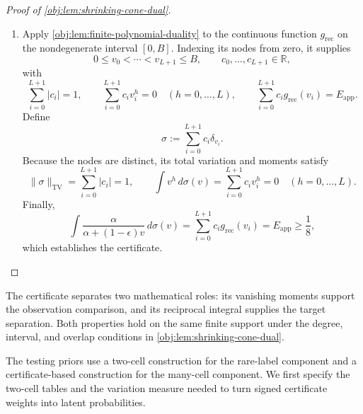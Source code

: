 \documentclass[11pt]{article}
\begin{document}
\begin{proof}[Proof of \cref{obj:lem:shrinking-cone-dual}]
\begin{enumerate}
In particular,
\[
|Q_{\mathrm{app}}'(v_{\mathrm{mvt}})|\,z_{\mathrm{rec}}
\le
\frac{9L^2}{4B}\,z_{\mathrm{rec}}
=
\frac{9}{400c_\epsilon}
\le
\frac{3}{100}
<
\frac14.
\]
This contradicts the chain
\[
\frac14
<
Q_{\mathrm{app}}(0)-Q_{\mathrm{app}}(z_{\mathrm{rec}})
\le
|Q_{\mathrm{app}}(z_{\mathrm{rec}})-Q_{\mathrm{app}}(0)|
=
|Q_{\mathrm{app}}'(v_{\mathrm{mvt}})|\,z_{\mathrm{rec}}.
\]
Therefore
\[
\|g_{\mathrm{rec}}-Q_{\mathrm{app}}\|_{\infty,[0,B]}
\ge\frac18,
\qquad
E_{\mathrm{app}}\ge\frac18.
\]

\item Apply \cref{obj:lem:finite-polynomial-duality} to the continuous function \(g_{\mathrm{rec}}\) on the nondegenerate interval \([0,B]\). Indexing its nodes from zero, it supplies
\[
0\le v_0<\cdots<v_{L+1}\le B,
\qquad
c_0,\ldots,c_{L+1}\in\mathbb R,
\]
with
\[
\sum_{i=0}^{L+1}|c_i|=1,
\qquad
\sum_{i=0}^{L+1}c_i v_i^h=0
\quad (h=0,\ldots,L),
\qquad
\sum_{i=0}^{L+1}c_i g_{\mathrm{rec}}(v_i)=E_{\mathrm{app}}.
\]
Define
\[
\sigma:=\sum_{i=0}^{L+1}c_i\delta_{v_i}.
\]
Because the nodes are distinct, its total variation and moments satisfy
\[
\|\sigma\|_{\mathrm{TV}}
=
\sum_{i=0}^{L+1}|c_i|=1,
\qquad
\int v^h\,d\sigma(v)
=
\sum_{i=0}^{L+1}c_i v_i^h=0
\quad (h=0,\ldots,L).
\]
Finally,
\[
\int\frac{\alpha}{\alpha+(1-\epsilon)v}\,d\sigma(v)
=
\sum_{i=0}^{L+1}c_i g_{\mathrm{rec}}(v_i)
=
E_{\mathrm{app}}
\ge\frac18,
\]
which establishes the certificate. %
\end{enumerate}
\end{proof}

The certificate separates two mathematical roles: its vanishing moments support the observation comparison, and its reciprocal integral supplies the target separation. Both properties hold on the same finite support under the degree, interval, and overlap conditions in \cref{obj:lem:shrinking-cone-dual}.

The testing priors use a two-cell construction for the rare-label component and a certificate-based construction for the many-cell component. We first specify the two-cell tables and the variation measure needed to turn signed certificate weights into latent probabilities.
\end{document}
